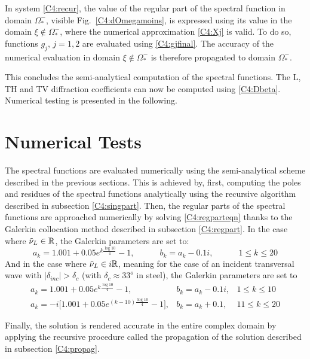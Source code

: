 In system \eqref{C4:recur}, the value of the regular part of the spectral function in domain $\Omega_*^-$, visible Fig.~\ref{C4:dOmegamoins}, is expressed using its value in the domain $\xi \notin \Omega_*^-$, where the numerical approximation \eqref{C4:Xj} is valid. To do so, functions $g_j,\, j=1,2$ are evaluated using \eqref{C4:gjfinal}. The accuracy of the numerical evaluation in domain $\xi \notin \Omega_*^-$ is therefore propagated to domain $\Omega_*^-$. 

This concludes the semi-analytical computation of the spectral functions. The L, TH and TV diffraction coefficients can now be computed using \eqref{C4:Dbeta}. Numerical testing is presented in the following. 

\section{Numerical Tests}
The spectral functions are evaluated numerically using the semi-analytical scheme described in the previous sections. This is achieved by, first, computing the poles and residues of the spectral functions analytically using the recursive algorithm described in subsection \ref{C4:singpart}. Then, the regular parts of the spectral functions are approached numerically by solving \eqref{C4:regparteqn} thanks to the Galerkin collocation method described in subsection \ref{C4:regpart}. In the case where $\tilde{\nu}_L \in \mathbb{R}$, the Galerkin parameters are set to:
\begin{equation}
a_k=1.001+0.05e^{k\frac{\log 10}{4}}-1, \hspace{3em} b_k=a_k-0.1i, \hspace{3em} 1\leq k\leq20
\end{equation}
And in the case where $\tilde{\nu}_L \in i\mathbb{R}$, meaning for the case of an incident transversal wave with $|\delta_{inc}|>\delta_c$ (with $\delta_c \approx 33^o$ in steel), the Galerkin parameters are set to
\begin{equation}
\begin{matrix}
a_k=1.001+0.05e^{k\frac{\log 10}{4}}-1, & b_k=a_k-0.1i, & 1\leq k\leq10\\
a_k=-i\lbrack 1.001+0.05e^{(k-10)\frac{\log 10}{4}}-1\rbrack, & b_k=a_k+0.1, & 11\leq k\leq20
\end{matrix}
\end{equation}

Finally, the solution is rendered accurate in the entire complex domain by applying the recursive procedure called the propagation of the solution described in subsection \ref{C4:propag}.

